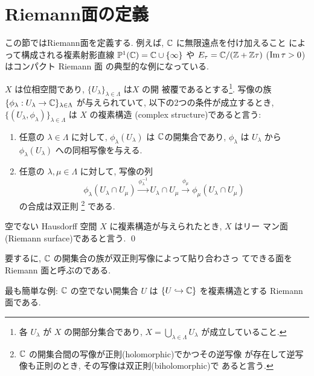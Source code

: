 \documentclass[12pt,twoside]{jarticle}
\def\Z{{\Bbb Z}} %
\def\C{{\Bbb C}} %
\def\P{{\Bbb P}}
\def\Impart{\mathop{\text{\rm Im}}\nolimits} %
\def\injto{\hookrightarrow}
\begin{document}

\section{Riemann面の定義}

この節ではRiemann面を定義する. 例えば, $\C$ に無限遠点を付け加えること
によって構成される複素射影直線 $\P^1(\C) = \C \cup \{\infty\}$ や %
$E_\tau = \C/(\Z+\Z\tau)$ ($\Impart \tau > 0$)はコンパクト Riemann 面
の典型的な例になっている.

\begin{Definition}
  $X$ は位相空間であり, $\{U_\lambda\}_{\lambda\in\Lambda}$ は$X$ の開
  被覆であるとする\footnote{各 $U_\lambda$ が $X$ の開部分集合であり,
    $X = \bigcup_{\lambda\in\Lambda} U_\lambda$ が成立していること.}. %
  写像の族 $\{\phi_\lambda : U_\lambda \to \C\}_{\lambda\in\Lambda}$ 
  が与えられていて, 以下の2つの条件が成立するとき, %
  $\{(U_\lambda,\phi_\lambda)\}_{\lambda\in\Lambda}$ は $X$ の複素構造
  (complex structure)であると言う: 
  \begin{enumerate}
  \item[(1)] 任意の $\lambda\in\Lambda$ に対して, %
    $\phi_\lambda(U_\lambda)$ は $\C$の開集合であり, $\phi_\lambda$ は 
    $U_\lambda$ から $\phi_\lambda(U_\lambda)$ への同相写像を与える.
  \item[(2)] 任意の $\lambda,\mu\in\Lambda$ に対して, 写像の列
    \[
      \phi_\lambda(U_\lambda\cap U_\mu)
      \overset{\phi_\lambda^{-1}}\longrightarrow
      U_\lambda\cap U_\mu
      \overset{\phi_\mu}\longrightarrow
      \phi_\mu(U_\lambda\cap U_\mu)
    \] %
    の合成は双正則%
    \footnote{$\C$ の開集合間の写像が正則(holomorphic)でかつその逆写像
      が存在して逆写像も正則のとき, その写像は双正則(biholomorphic)で
      あると言う.}%
    である.
  \end{enumerate}
  空でない Hausdorff 空間 $X$ に複素構造が与えられたとき, $X$ はリー
  マン面(Riemann surface)であると言う. \qed
\end{Definition}

\noindent 要するに, $\C$ の開集合の族が双正則写像によって貼り合わさっ
てできる面を Riemann 面と呼ぶのである.

\medskip

\noindent 最も簡単な例: $\C$ の空でない開集合 $U$ は $\{U \injto \C\}$ %
を複素構造とする Riemann 面である.
\end{document}
